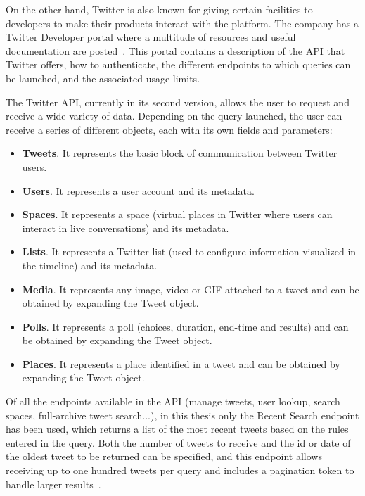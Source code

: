 \nonzeroparskip On the other hand, Twitter is also known for giving certain facilities to developers to make their products interact with the platform. The company has a Twitter Developer portal where a multitude of resources and useful documentation are posted~\cite{twitter_dev}. This portal contains a description of the API that Twitter offers, how to authenticate, the different endpoints to which queries can be launched, and the associated usage limits. 

\nonzeroparskip The Twitter API, currently in its second version, allows the user to request and receive a wide variety of data. Depending on the query launched, the user can receive a series of different objects, each with its own fields and parameters:
\begin{itemize}
	\item \textbf{Tweets}. It represents the basic block of communication between Twitter users.
	\item \textbf{Users}. It represents a user account and its metadata.
	\item \textbf{Spaces}. It represents a space (virtual places in Twitter where users can interact in live conversations) and its metadata.
	\item \textbf{Lists}. It represents a Twitter list (used to configure information visualized in the timeline) and its metadata.
	\item \textbf{Media}. It represents any image, video or GIF attached to a tweet and can be obtained by expanding the Tweet object.
	\item \textbf{Polls}. It represents a poll (choices, duration, end-time and results) and can be obtained by expanding the Tweet object.
	\item \textbf{Places}. It represents a place identified in a tweet and can be obtained by expanding the Tweet object.
\end{itemize}

\nonzeroparskip Of all the endpoints available in the API (manage tweets, user lookup, search spaces, full-archive tweet search...), in this thesis only the Recent Search endpoint has been used, which returns a list of the most recent tweets based on the rules entered in the query. Both the number of tweets to receive and the id or date of the oldest tweet to be returned can be specified, and this endpoint allows receiving up to one hundred tweets per query and includes a pagination token to handle larger results~\cite{twitter_dev_searchtweets}.

